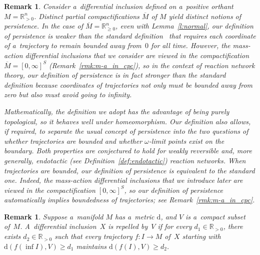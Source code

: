 \documentclass[pdftex]{sigma}
\newtheorem{Remark}[Theorem]{Remark}
\newcommand\ol[1]{{\overline {#1}}}
\begin{document}
\begin{Remark}
\label{rmk:def_pers}
Consider a~dif\/ferential inclusion def\/ined on a~positive orthant $M=\mathbb{R}_{>0}^n$.
Distinct partial compactif\/ications $\ol M$ of $M$ yield distinct notions of persistence.
In the case of $\ol M=\mathbb{R}_{\geq 0}^n$, even with Lemma~\ref{l:normal}, our def\/inition of persistence is weaker
than the standard def\/inition~\cite{Freed} that requires each coordinate of a~trajectory to remain bounded away
from~$0$ for all time.
However, the mass-action dif\/ferential inclusions that we consider are viewed in the compactif\/ication $\ol
M=[0,\infty]^S$ (Remark~\ref{rmk:m-a_in_cpc}), so in the context of reaction network theory, our def\/inition of
persistence is in fact stronger than the standard def\/inition because coordinates of trajectories not only must be
bounded away from zero but also must avoid going to inf\/inity.

Mathematically, the def\/inition we adopt has the advantage of being purely topological, so it behaves well under
homeomorphism.
Our def\/inition also allows, if required, to separate the usual concept of persistence into the two questions of
whether trajectories are bounded and whether $\omega$-limit points exist on the boundary.
Both properties are conjectured to hold for weakly reversible and, more generally, endotactic (see
Def\/inition~\ref{def:endotactic}) reaction networks.
When trajectories are bounded, our def\/inition of persistence is equivalent to the standard one.
Indeed, the mass-action dif\/ferential inclusions that we introduce later are viewed in the compactif\/ication
$[0,\infty]^{S}$, so our def\/inition of persistence automatically implies boundedness of trajectories; see
Remark~\ref{rmk:m-a_in_cpc}.
\end{Remark}

\begin{Remark}
\label{rmk:repel_dist}
Suppose a~manifold $M$ has a~metric $\mathrm{d}$, and $V$ is a~compact subset of~$M$.
A~dif\/ferential inclusion~$X$ is repelled by~$V$ if for every $d_1\in\mathbb{R}_{>0}$, there exists
$d_2\in\mathbb{R}_{>0}$ such that every trajectory $f:I\to M$ of~$X$ starting with $\mathrm{d}(f(\inf{I}),V)\geq d_1$
maintains $\mathrm{d}(f(I),V)\geq d_2$.
\end{Remark}
\end{document}
